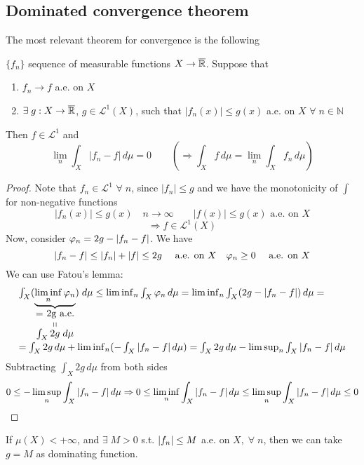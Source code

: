 \subsection{Dominated convergence theorem}
The most relevant theorem for convergence is the following
\begin{theorem}
    \(\{f_n\}\) sequence of measurable functions \(X \to \overline{\mathbb{R}}\). Suppose that
    \begin{enumerate}
        \item \(f_n \to f \) a.e. on \(X\)
        \item \(\exists \; g : X \to \overline{\mathbb{R}} \), \(g \in \mathcal{L}^1(X)\), such that \(|f_n(x)| \leq g(x)\) a.e. on \(X\) \(\forall \; n \in \mathbb{N}\)
    \end{enumerate}
    Then \(f \in \mathcal{L}^1\) and 
    \[
        \lim_n \int_X |f_n -f| \, d\mu = 0 
        \qquad \left( \Rightarrow \int_X f \, d\mu = \lim_n \int_X f_n \, d\mu \right)  
    \]
\end{theorem}
\begin{proof}
    Note that \(f_n \in \mathcal{L}^1\) \(\forall \; n\), since \(|f_n| \leq g\) and we have the monotonicity of \(\int\) for non-negative functions
    \[
        |f_n(x)| \leq g(x) \quad
        n \to \infty \qquad
        |f(x)| \leq g(x) \text{  a.e. on } X 
    \]
    \[ 
        \Rightarrow f \in \mathcal{L}^1(X)
    \]  
    Now, consider \(\oldphi_n = 2g - |f_n - f|\). We have
    \[
        |f_n-f| \leq |f_n|+|f| \leq 2g \quad \text{ a.e. on }X \quad \oldphi_n \geq 0 \quad \text{ a.e. on }X  
    \]
    We can use Fatou's lemma:
    \[\begin{array}{l}
        \int_X (\underbrace{\liminf_n \oldphi_n}_{\stackbelowlittle{\mbox{= 2g a.e.}}{\int_X 2g \; d\mu}}) \; d\mu \leq \liminf_n \int_X \oldphi_n \, d\mu = \liminf_n \int_X (2g - \abs{f_n - f}) \, d\mu = \\
        = \int_X 2g \, d\mu + \liminf_n (-\int_X \abs{f_n - f} \, d\mu) =\int_X 2g \, d\mu - \limsup_n \int_X \abs{f_n - f} \, d\mu
    \end{array}
    \]
    Subtracting \(\int_X 2g \, d\mu\) from both sides 
    \[
        0 \leq -\limsup_n \int_X \abs{f_n - f} \, d\mu \Rightarrow 0 \leq \liminf_n \int_X \abs{f_n - f} \, d\mu \leq \limsup_n \int_X \abs{f_n - f} \, d\mu \leq 0 
    \]  
\end{proof}
\begin{remark}
    If \(\mu(X) < +\infty\), and \(\exists \; M > 0\) s.t. \(\abs{f_n} \leq M\) a.e. on \(X, \; \forall \; n\), then we can take \(g = M\) as dominating function.
\end{remark}

